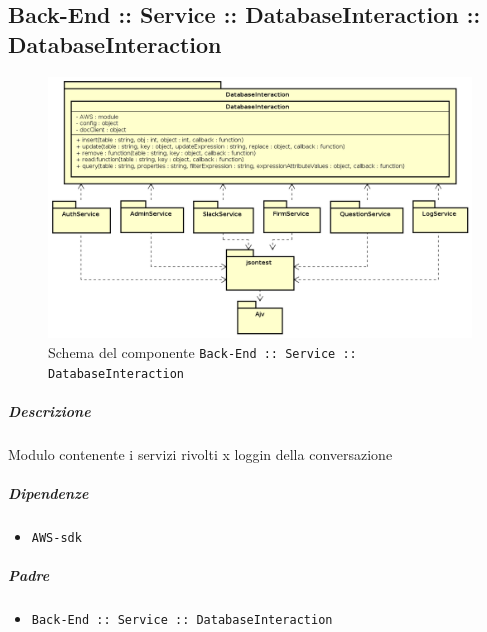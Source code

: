 \documentclass[../ManualeSviluppatore_v1.0.0.tex]{subfiles}
\begin{document}
\subsection{Back-End :: Service :: DatabaseInteraction :: DatabaseInteraction}
\begin{figure}[!h]
	\centering
	\includegraphics[scale=0.5]{Architettura/Back-End/Service/DatabaseInteraction.png}
	\caption{Schema del componente \texttt{Back-End :: Service :: DatabaseInteraction}}
\end{figure}
\subparagraph{Descrizione} Modulo contenente i servizi rivolti x loggin della conversazione
\subparagraph{Dipendenze}
\begin{itemize}
	\item \texttt{AWS-sdk}
\end{itemize}
\subparagraph{Padre}
\begin{itemize}
	\item \texttt{Back-End :: Service :: DatabaseInteraction}
\end{itemize}
\end{document}
